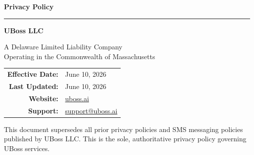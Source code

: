 \documentclass[11pt, letterpaper]{article}
\begin{document}
\begin{titlepage}
\begin{center}

\vspace*{3cm}

{\Huge\bfseries\textcolor{ubossblue}{Privacy Policy}}

\vspace{0.5cm}

{\Large\textcolor{ubossaccent}{\rule{8cm}{2pt}}}

\vspace{1cm}

{\LARGE\bfseries UBoss LLC}

\vspace{0.5cm}

{\large A Delaware Limited Liability Company\\
Operating in the Commonwealth of Massachusetts}

\vspace{2cm}

\begin{tabular}{rl}
\textbf{Effective Date:} & June 10, 2026 \\
\textbf{Last Updated:}   & June 10, 2026 \\
\textbf{Website:}        & \href{https://uboss.ai}{uboss.ai} \\
\textbf{Support:}        & \href{mailto:support@uboss.ai}{support@uboss.ai} \\
\end{tabular}

\vfill

{\small\textcolor{ubossgray}{This document supersedes all prior privacy policies and SMS messaging
policies published by UBoss LLC. This is the sole, authoritative privacy policy governing
UBoss services.}}

\end{center}
\end{titlepage}
\end{document}
